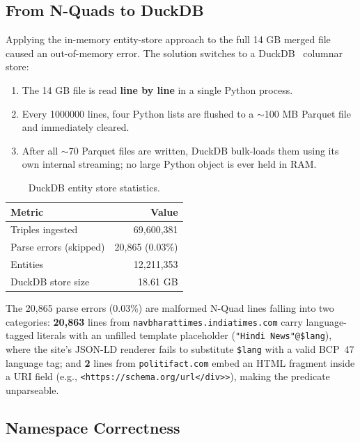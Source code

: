 \documentclass[11pt,a4paper]{article}
\begin{document}
\subsection{From N-Quads to DuckDB}

Applying the in-memory entity-store approach to the full 14 GB merged file
caused an out-of-memory error.  The solution switches to a DuckDB~\citep{raasveldt2019duckdb} columnar
store:

\begin{enumerate}[leftmargin=1.5em]
  \item The 14 GB file is read \textbf{line by line} in a single Python process.
  \item Every \num{1000000} lines, four Python lists are flushed to a
        $\sim$100 MB Parquet file and immediately cleared.
  \item After all $\sim$70 Parquet files are written, DuckDB bulk-loads them
        using its own internal streaming; no large Python object is ever held
        in RAM.
\end{enumerate}

\begin{table}[H]
\centering
\caption{DuckDB entity store statistics.}
\label{tab:db}
\begin{tabular}{lr}
\toprule
\textbf{Metric} & \textbf{Value} \\
\midrule
Triples ingested        & 69{,}600{,}381 \\
Parse errors (skipped)  &     20{,}865 \; (0.03\%) \\
Entities                & 12{,}211{,}353 \\
DuckDB store size       & 18.61 GB \\
\bottomrule
\end{tabular}
\end{table}

The 20{,}865 parse errors (0.03\%) are malformed N-Quad lines falling into two
categories: \textbf{20{,}863} lines from \texttt{navbharattimes.indiatimes.com}
carry language-tagged literals with an unfilled template placeholder
(\texttt{"Hindi News"@\$lang}), where the site's JSON-LD renderer fails to
substitute \texttt{\$lang} with a valid BCP~47 language tag; and \textbf{2}
lines from \texttt{politifact.com} embed an HTML fragment inside a URI field
(e.g., \texttt{<https://schema.org/url</div>{}>}), making the predicate
unparseable.



\subsection{Namespace Correctness}
\end{document}
